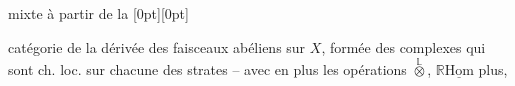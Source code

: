 mixte à partir de la \raisebox{0pt}[0pt][0pt]{\parbox{0pt}{}}catégorie de la 
dérivée des faisceaux abéliens sur $X$,
formée des complexes qui sont  ch. loc.
 sur chacune des strates -- avec
en plus les opérations $\overset{\mathbb{L}}{\otimes}$, $\mathbb{R}\underline{\mathrm{Hom}}$ plus, 

